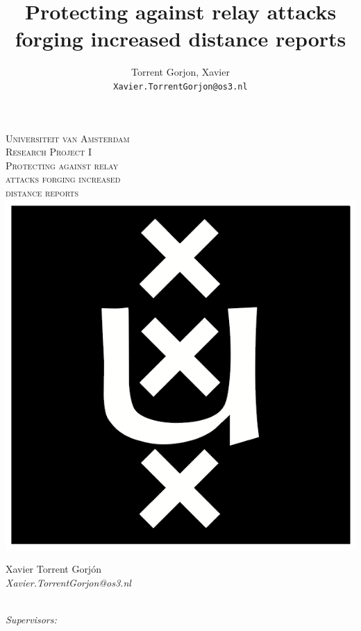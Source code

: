 \documentclass{article}
\author{
  Torrent Gorjon, Xavier\\
  \texttt{Xavier.TorrentGorjon@os3.nl}
}
\title{Protecting against relay attacks forging increased distance reports}
\begin{document}
\begin{titlepage}
\center
\textsc{\LARGE Universiteit van Amsterdam}\\[1.5cm]

\textsc{\Large Research Project I}\\[0.5cm]

\textsc{\Huge Protecting against relay\\[0cm] attacks forging increased\\[0.5cm] distance reports}\\[1.5cm]

\includegraphics[scale=0.8]{images/uva.png}\\[1cm]

\begin{minipage}{0.5 \textwidth}
\begin{center} \large
Xavier Torrent Gorj\'{o}n\\
\emph{Xavier.TorrentGorjon@os3.nl}\\[0.5cm]
\end{center}
\end{minipage}\\[2cm]

{\large \emph{Supervisors:}}\\[0.5cm]


\end{titlepage}
\end{document}
